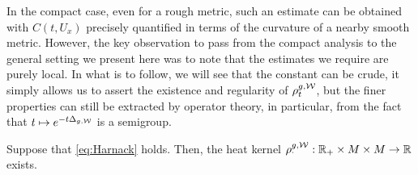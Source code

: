 \documentclass[a4paper, 12pt]{amsart}
\begin{document}
In the compact case, even for a
rough metric, such an estimate can be
obtained with $C(t,U_x)$ precisely quantified
in terms of the curvature of a nearby smooth metric.
However, the key observation to pass from the compact analysis
to the general setting we present here was to note that
the estimates we require are purely local. In 
what is to follow, we will see that the constant can be
crude, it simply allows us to assert the existence and regularity
of $\rho^{g,\mathcal{W}}_t$, but the finer properties can still 
be extracted by operator theory, in particular, from the 
fact that $t \mapsto e^{-t\Delta_{g,\mathcal{W}}}$ is a semigroup.

\begin{prop}
\label{Prop:MainRed}
Suppose that \eqref{eq:Harnack} holds. Then, the heat
kernel $\rho^{g,\mathcal{W}}_{\cdotp}: \mathbb{R}_{+} \times M \times M \to \mathbb{R}$
exists.
\end{prop} 
\end{document}
